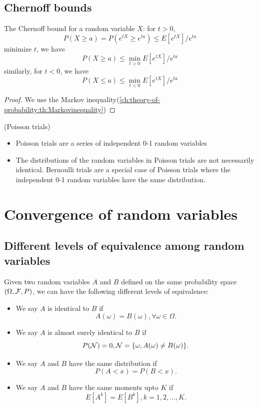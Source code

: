 \begin{refsection}
\subsection{Chernoff bounds}
\begin{theorem}
\cite{mitzenmacher2005probability}The Chernoff bound for a random variable $X$: for $t>0$, $$P(X\geq a) = P(e^{tX} \geq e^{ta}) \leq E[e^{tX}]/e^{ta}$$
minimize $t$, we have
$$P(X\geq a) \leq \min_{t>0}E[e^{tX}]/e^{ta}$$
similarly, for $t<0$, we have
$$P(X\leq a) \leq \min_{t<0}E[e^{tX}]/e^{ta}$$	
\end{theorem}
\begin{proof}
We use the Markov inequality(\autoref{ch:theory-of-probability:th:Markovinequality})
\end{proof}

\begin{remark} (Poisson trials)
\begin{itemize}
    \item Poisson trials are a series of independent 0-1 random variables
    \item The distributions of the random variables in Poisson trials are not necessarily identical. Bernoulli trials are a special case of Poisson trials where the independent 0-1 random variables have the same distribution.
\end{itemize}
\end{remark}




\section{Convergence of random variables}
\subsection{Different levels of equivalence among random variables}

\begin{remark}[]
Given two random variables $A$ and $B$ defined on the same probability space $(\Omega, \mathcal{F}, P)$, we can have the following different levels of equivalence:
\begin{itemize}
	\item We say $A$ is identical to $B$ if $$A(\omega) = B(\omega), \forall \omega\in \Omega.$$
	\item We say $A$ is almost surely identical to $B$ if $$P(\mathcal{N}) = 0, \mathcal{N} = \{\omega, A(\omega) \neq B(\omega) \}.$$
	\item We say $A$ and $B$ have the same distribution if $$P(A <x) = P(B < x).$$
	\item We say $A$ and $B$ have the same moments upto $K$ if $$E[A^k] = E[B^k], k=1,2,...,K.$$
\end{itemize}
\end{remark}



\end{refsection}
